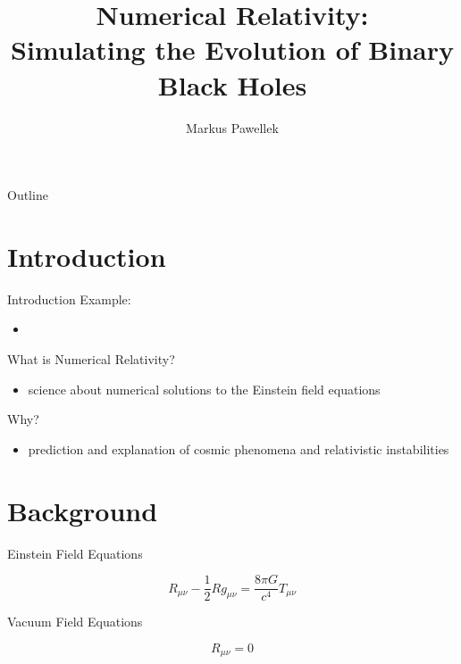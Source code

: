 \documentclass[aspectratio=169]{beamer}
\title{Numerical Relativity: \\ Simulating the Evolution of Binary Black Holes}
\author{Markus Pawellek}
\begin{document}
  \frame{\titlepage}
  \begin{frame}{Outline}
    \footnotesize
    \hfill\parbox[t][7cm][l]{0.9\textwidth}{\tableofcontents}
  \end{frame}

  \section{Introduction} %
  \label{sec:introduction}
    \begin{frame}{Introduction}
      Example:
      \begin{itemize}
        \item{
          \href{run:videos/sxs-bbh-gravitational_lensing_of_gw150914.webm}{}
          \href{https://en.wikipedia.org/wiki/File:BBH_gravitational_lensing_of_gw150914.webm}{}
        }
      \end{itemize}
      \bigskip

      \pause
      What is Numerical Relativity?
      \begin{itemize}
        \item science about numerical solutions to the Einstein field equations
      \end{itemize}
      \bigskip

      \pause
      Why?
      \begin{itemize}
        \item prediction and explanation of cosmic phenomena and relativistic instabilities
      \end{itemize}
    \end{frame}

  \section{Background} %
  \label{sec:background}
    \begin{frame}{Einstein Field Equations}
      \begin{mybox}
        \[
          R_{μν} - \frac{1}{2}Rg_{μν} = \frac{8\pi G}{c^4}T_{μν}
        \]
      \end{mybox}
    \end{frame}
    \begin{frame}{Vacuum Field Equations}
      \begin{mybox}
        \[
          R_{μν} = 0
        \]
      \end{mybox}
    \end{frame}
\end{document}
